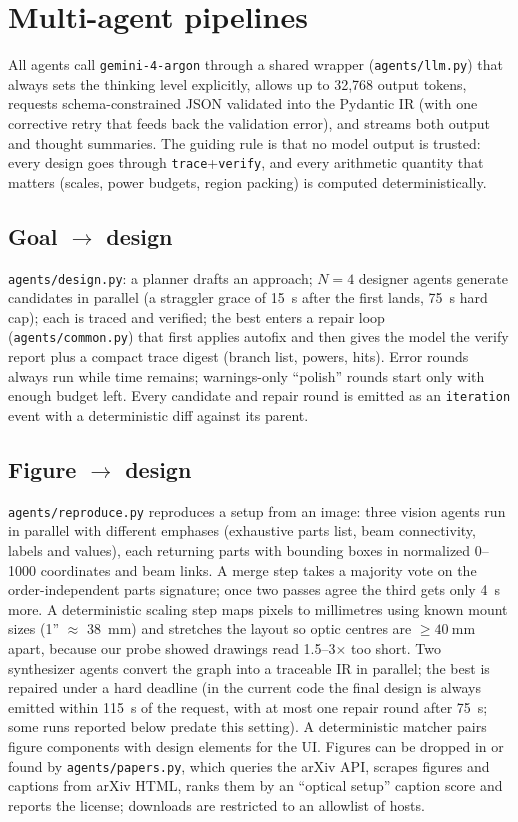 \documentclass[10pt,twocolumn,letterpaper]{article}
\newcommand{\code}[1]{\texttt{\small #1}}
\begin{document}
\section{Multi-agent pipelines}
\label{sec:agents}
All agents call \code{gemini-4-argon} through a shared wrapper (\code{agents/llm.py}) that always sets the thinking level explicitly, allows up to 32{,}768 output tokens, requests schema-constrained JSON validated into the Pydantic IR (with one corrective retry that feeds back the validation error), and streams both output and thought summaries. The guiding rule is that no model output is trusted: every design goes through \code{trace}+\code{verify}, and every arithmetic quantity that matters (scales, power budgets, region packing) is computed deterministically.

\subsection{Goal $\to$ design}
\code{agents/design.py}: a planner drafts an approach; $N=4$ designer agents generate candidates in parallel (a straggler grace of \SI{15}{\second} after the first lands, \SI{75}{\second} hard cap); each is traced and verified; the best enters a repair loop (\code{agents/common.py}) that first applies autofix and then gives the model the verify report plus a compact trace digest (branch list, powers, hits). Error rounds always run while time remains; warnings-only ``polish'' rounds start only with enough budget left. Every candidate and repair round is emitted as an \code{iteration} event with a deterministic diff against its parent.

\subsection{Figure $\to$ design}
\code{agents/reproduce.py} reproduces a setup from an image: three vision agents run in parallel with different emphases (exhaustive parts list, beam connectivity, labels and values), each returning parts with bounding boxes in normalized 0--1000 coordinates and beam links. A merge step takes a majority vote on the order-independent parts signature; once two passes agree the third gets only \SI{4}{\second} more. A deterministic scaling step maps pixels to millimetres using known mount sizes (1'' $\approx$ \SI{38}{\milli\metre}) and stretches the layout so optic centres are $\ge\SI{40}{\milli\metre}$ apart, because our probe showed drawings read 1.5--3$\times$ too short. Two synthesizer agents convert the graph into a traceable IR in parallel; the best is repaired under a hard deadline (in the current code the final design is always emitted within \SI{115}{\second} of the request, with at most one repair round after \SI{75}{\second}; some runs reported below predate this setting). A deterministic matcher pairs figure components with design elements for the UI. Figures can be dropped in or found by \code{agents/papers.py}, which queries the arXiv API, scrapes figures and captions from arXiv HTML, ranks them by an ``optical setup'' caption score and reports the license; downloads are restricted to an allowlist of hosts.
\end{document}
